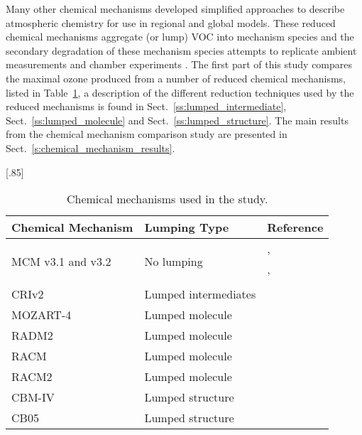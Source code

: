 Many other chemical mechanisms developed simplified approaches to describe atmospheric chemistry for use in regional and global models.
These reduced chemical mechanisms aggregate (or lump) VOC into mechanism species and the secondary degradation of these mechanism species attempts to replicate ambient measurements and chamber experiments \citep{Stockwell:2012}.
The first part of this study compares the maximal ozone produced from a number of reduced chemical mechanisms, listed in Table~\ref{t:mechanisms}, a description of the different reduction techniques used by the reduced mechanisms is found in Sect.~\ref{ss:lumped_intermediate}, Sect.~\ref{ss:lumped_molecule} and Sect.~\ref{ss:lumped_structure}.
The main results from the chemical mechanism comparison study are presented in Sect.~\ref{s:chemical_mechanism_results}.
\begin{table}[t]%
    \begin{center}%
        \caption{Chemical mechanisms used in the study.}%
        \scalebox{.85}[.85]{\begin{tabular}{lll}%
                \hline \hline
                \textbf{Chemical Mechanism} & \textbf{Lumping Type} & \textbf{Reference} \\
                \hline \hline
                \multirow{3}{*}{MCM v3.1 and v3.2} & \multirow{3}{*}{No lumping} & \citet{Jenkin:1997}, \citet{Jenkin:2003} \\
                & & \citet{Saunders:2003}, \citet{Bloss:2005} \\
                & & \citet{MCM_Site} \\
                CRIv2 & Lumped intermediates & \citet{Jenkin:2008} \\
                MOZART-4 & Lumped molecule & \citet{Emmons:2010} \\
                RADM2 & Lumped molecule & \citet{Stockwell:1990} \\
                RACM & Lumped molecule & \citet{Stockwell:1997} \\
                RACM2 & Lumped molecule & \citet{Goliff:2013} \\
                CBM-IV & Lumped structure & \citet{Gery:1989} \\
                CB05 & Lumped structure & \citet{Yarwood:2005} \\
                \hline \hline
            \end{tabular}%
        }%
        \label{t:mechanisms}%
    \end{center}%
\end{table}%

